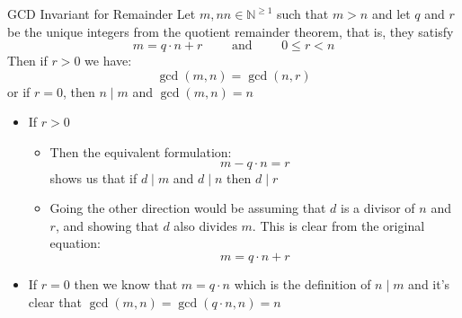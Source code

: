 \documentclass{standalone}
\begin{document}
\begin{deduction*}{GCD Invariant for Remainder}
  Let $ m,nn \in \mathbb{N} ^{\ge 1}$ such that $ m > n$ and let $ q$ and $ r$ be the unique integers from the quotient remainder theorem, that is, they satisfy
  \[
    m =  q  \cdot n  +  r \qquad \text{ and } \qquad 0 \le r < n
  \]
  Then if $ r > 0$ we have:
  \[
  \gcd(m,n) = \gcd(n,r)
  \]
  or if $ r = 0$, then $ n \mid m$ and $ \gcd(m,n)= n$ 
  \begin{pf}
    \begin{itemize}
      \item If $ r > 0$ 
        \begin{itemize}
          \item Then the equivalent formulation:
          \[
          m - q  \cdot n =  r
          \]
          shows us that if $ d \mid m$ and $ d \mid n$ then $ d \mid r$
        \item Going the other direction would be assuming that $ d$ is a divisor of $ n$ and $ r$, and showing that $ d$ also divides $ m$. This is clear from the original equation:
          \[
            m = q  \cdot  n  +  r
          \]
        \end{itemize}
        \item If $ r =  0$ then we know that $ m = q  \cdot n$ which is the definition of $ n \mid m$ and it's clear that $ \gcd(m, n) = \gcd(q  \cdot n, n) =  n$ 
    \end{itemize}
  \end{pf}
\end{deduction*}
\end{document}

